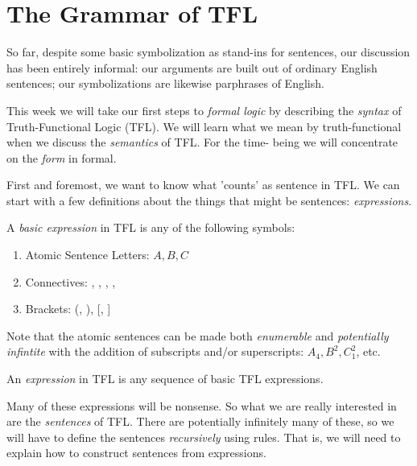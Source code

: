 \section{The Grammar of TFL}

So far, despite some basic symbolization as stand-ins for sentences, our
discussion has been entirely informal: our arguments are built out of
ordinary English sentences; our symbolizations are likewise parphrases of
English.

This week we will take our first steps to \emph{formal logic} by describing
the \emph{syntax} of Truth-Functional Logic (TFL). We will learn what we mean
by truth-functional when we discuss the \emph{semantics} of TFL. For the time-
being we will concentrate on the \emph{form} in formal.

First and foremost, we want to know what 'counts' as sentence in TFL. We can
start with a few definitions about the things that might be sentences:
\emph{expressions}.
\\
\begin{definition}
  A \emph{basic expression} in TFL is any of the following symbols:
  \begin{enumerate}
  \item Atomic Sentence Letters: $A, B, C$
  \item Connectives: \enot, \eand, \eor, \eif, \eiff
  \item Brackets: (, ), [, ]
  \end{enumerate}
\end{definition}
Note that the atomic sentences can be made both \emph{enumerable} and
\emph{potentially infintite} with the addition of subscripts and/or
superscripts: $A_4, B^2, C_1^2$, etc.
\\
\begin{definition}
An \emph{expression} in TFL is any sequence of basic TFL expressions.
\end{definition}
Many of these expressions will be nonsense. So what we are really interested in
are the \emph{sentences} of TFL. There are potentially infinitely many of
these, so we will have to define the sentences \emph{recursively} using rules.
That is, we will need to explain how to construct sentences from expressions.
\\
